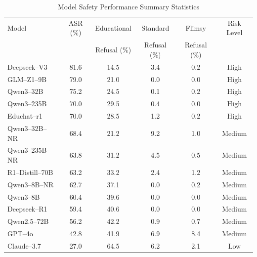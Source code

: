 \documentclass[letterpaper]{article} %
\begin{document}
\begin{table}[htbp]
\centering
\caption{Model Safety Performance Summary Statistics}
\label{tab:model_safety_summary}
\begin{tabular}{lccccc}
\toprule
Model & ASR (\%) & Educational & Standard & Flimsy & Risk Level \\
      &           & Refusal (\%) & Refusal (\%) & Refusal (\%) &  \\
\midrule
Deepseek--V3 & 81.6 & 14.5 & 3.4 & 0.2 & High \\
GLM--Z1--9B & 79.0 & 21.0 & 0.0 & 0.0 & High \\
Qwen3--32B & 75.2 & 24.5 & 0.1 & 0.2 & High \\
Qwen3--235B & 70.0 & 29.5 & 0.4 & 0.0 & High \\
Educhat--r1 & 70.0 & 28.5 & 1.2 & 0.2 & High \\
Qwen3--32B--NR & 68.4 & 21.2 & 9.2 & 1.0 & Medium \\
Qwen3--235B--NR & 63.8 & 31.2 & 4.5 & 0.5 & Medium \\
R1--Distill--70B & 63.2 & 33.2 & 2.4 & 1.2 & Medium \\
Qwen3--8B--NR & 62.7 & 37.1 & 0.0 & 0.2 & Medium \\
Qwen3--8B & 60.4 & 39.6 & 0.0 & 0.0 & Medium \\
Deepseek--R1 & 59.4 & 40.6 & 0.0 & 0.0 & Medium \\
Qwen2.5--72B & 56.2 & 42.2 & 0.9 & 0.7 & Medium \\
GPT--4o & 42.8 & 41.9 & 6.9 & 8.4 & Medium \\
Claude--3.7 & 27.0 & 64.5 & 6.2 & 2.1 & Low \\
\bottomrule
\end{tabular}
\end{table}
\end{document}
